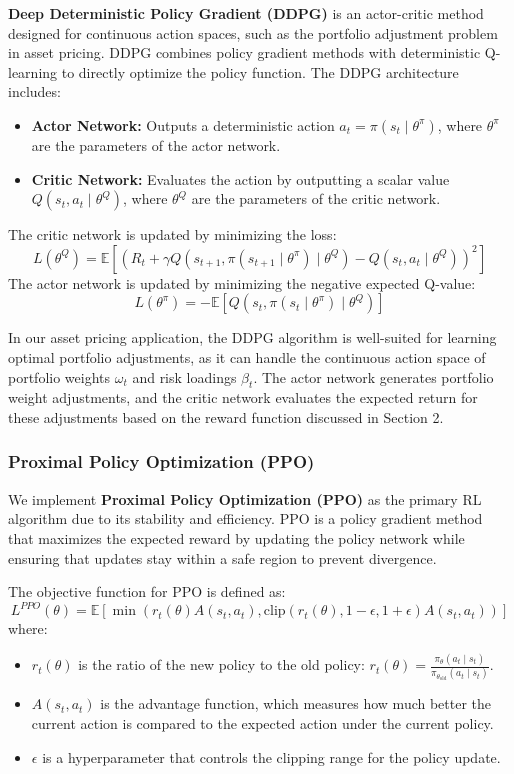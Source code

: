 \textbf{Deep Deterministic Policy Gradient (DDPG)} is an actor-critic method designed for continuous action spaces, such as the portfolio adjustment problem in asset pricing. DDPG combines policy gradient methods with deterministic Q-learning to directly optimize the policy function. The DDPG architecture includes:
\begin{itemize}
    \item \textbf{Actor Network:} Outputs a deterministic action $a_t = \pi(s_t \mid \theta^\pi)$, where $\theta^\pi$ are the parameters of the actor network.
    \item \textbf{Critic Network:} Evaluates the action by outputting a scalar value $Q(s_t, a_t \mid \theta^Q)$, where $\theta^Q$ are the parameters of the critic network.
\end{itemize}

The critic network is updated by minimizing the loss:
\[
L(\theta^Q) = \mathbb{E} \left[ \left( R_t + \gamma Q(s_{t+1}, \pi(s_{t+1} \mid \theta^\pi) \mid \theta^Q) - Q(s_t, a_t \mid \theta^Q) \right)^2 \right]
\]
The actor network is updated by minimizing the negative expected Q-value:
\[
L(\theta^\pi) = -\mathbb{E} \left[ Q(s_t, \pi(s_t \mid \theta^\pi) \mid \theta^Q) \right]
\]

In our asset pricing application, the DDPG algorithm is well-suited for learning optimal portfolio adjustments, as it can handle the continuous action space of portfolio weights $\omega_t$ and risk loadings $\beta_t$. The actor network generates portfolio weight adjustments, and the critic network evaluates the expected return for these adjustments based on the reward function discussed in Section 2.

\subsubsection*{Proximal Policy Optimization (PPO)}

We implement \textbf{Proximal Policy Optimization (PPO)} as the primary RL algorithm due to its stability and efficiency. PPO is a policy gradient method that maximizes the expected reward by updating the policy network while ensuring that updates stay within a safe region to prevent divergence.

The objective function for PPO is defined as:
\[
L^{PPO}(\theta) = \mathbb{E} \left[ \min\left( r_t(\theta) A(s_t, a_t), \text{clip}(r_t(\theta), 1 - \epsilon, 1 + \epsilon) A(s_t, a_t) \right) \right]
\]
where:
\begin{itemize}
    \item $r_t(\theta)$ is the ratio of the new policy to the old policy: $r_t(\theta) = \frac{\pi_\theta(a_t \mid s_t)}{\pi_{\theta_{\text{old}}}(a_t \mid s_t)}$.
    \item $A(s_t, a_t)$ is the advantage function, which measures how much better the current action is compared to the expected action under the current policy.
    \item $\epsilon$ is a hyperparameter that controls the clipping range for the policy update.
\end{itemize}

